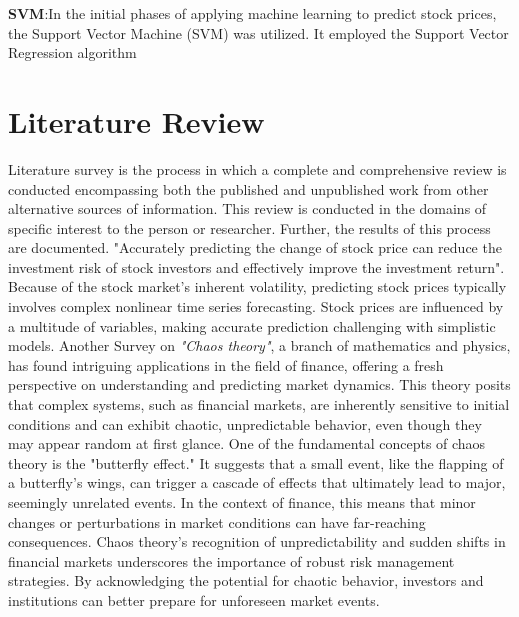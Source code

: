 \documentclass[./main.tex]{subfiles}
\begin{document}
\noindent 
    \textbf{SVM}:In the initial phases of applying machine learning to predict stock prices, the Support Vector Machine (SVM) was utilized. It employed the Support Vector Regression algorithm \cite{BENIWAL2023110566}
      


\newpage
        
\section{Literature Review}
Literature survey is the process in which a complete and comprehensive review is
conducted encompassing both the published and unpublished work from other
alternative sources of information. This review is conducted in the domains of
specific interest to the person or researcher. Further, the results of this process are
documented.
\medskip
\newline
\noindent
"Accurately predicting the change of stock price can reduce the investment risk of stock investors and effectively improve the investment return". \cite{lu2021cnn-bilstm-am}
Because of the stock market's inherent volatility, predicting stock prices typically involves complex nonlinear time series forecasting. Stock prices are influenced by a multitude of variables, making accurate prediction challenging with simplistic models.
\medskip
\newline
\noindent 
Another Survey on \textit{"Chaos theory"}, a branch of mathematics and physics, has found intriguing applications in the field of finance,
offering a fresh perspective on understanding and predicting market dynamics. This theory posits that complex systems, such as financial markets, are inherently sensitive to initial conditions and can exhibit chaotic, unpredictable behavior, even though they may appear random at first glance. \cite{KLIOUTCHNIKOV2017368} 
One of the fundamental concepts of chaos theory is the "butterfly effect." It suggests that a small event, like the flapping of a butterfly's wings, can trigger a cascade of effects that ultimately lead to major, seemingly unrelated events. In the context of finance, this means that minor changes or perturbations in market conditions can have far-reaching consequences. 
Chaos theory's recognition of unpredictability and sudden shifts in financial markets underscores the importance of robust risk management strategies. By acknowledging the potential for chaotic behavior, 
investors and institutions can better prepare for unforeseen market events.
\medskip
\newline
\end{document}
